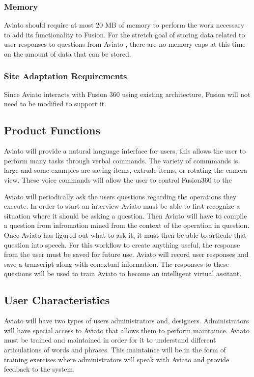 \documentclass[onecolumn, draftclsnofoot,10pt, compsoc]{IEEEtran}
\def \botname{Aviato }
\def \totalMemoryRequirement{20 MB }
\begin{document}
        \subsubsection{Memory} 
            \botname should require at most \totalMemoryRequirement of memory to perform the work necessary to add its functionality to Fusion.
            For the stretch goal of storing data related to user responses to questions from \botname, there are no memory caps at this time on the amount of data that can be stored.


        \subsubsection{Site Adaptation Requirements} 
            Since \botname interacts with Fusion 360 using existing architecture, Fusion will not need to be modified to support it. 

    \subsection{Product Functions}
		\botname will provide a natural language interface for users, this allows the user to perform many tasks through verbal commands.
		The variety of commmands is large and some examples are saving items, extrude items, or rotating the camera view.
		These voice commands will allow the user to control Fusion360 to the
		
		\botname will periodically ask the users questions regarding the operations they execute.
		In order to start an interview \botname must be able to first recognize a situation where it should be asking a question.
		Then \botname will have to compile a question from infromation mined from the context of the operation in question.
		Once \botname has figured out what to ask it, it must then be able to articule that question into speech.
		For this workflow to create anything useful, the response from the user must be saved for future use.
		\botname will  record user responses and save a transcript along with conextual information.
		The responses to these questions will be used to train \botname to become an intelligent virtual assitant.
		
    \subsection{User Characteristics}
		\botname will have two types of users administrators and, designers. 
		Administrators will have special access to \botname that allows them to perform maintaince.
		\botname must be trained and maintained in order for it to understand different articulations of words and phrases. 
		This maintaince will be in the form of training exercises where administrators will speak with \botname and provide feedback to the system.
		
\end{document}
